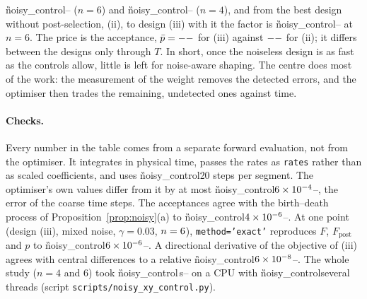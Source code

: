 \G{noisy_control}{\NCSixPostFactor}{--} ($n=6$) and \G{noisy_control}{\NCFourPostFactor}{--} ($n=4$), and from the best
design without post-selection, (ii), to design (iii) with it the factor is \G{noisy_control}{\NCSixGainTotal}{--} at
$n=6$. The price is the acceptance, $\bar p=\G{noisy_control}{\NCSixPThree}{--}$ for (iii) against
$\G{noisy_control}{\NCSixPTwo}{--}$ for (ii); it differs between the designs only through $T$. In short, once the
noiseless design is as fast as the controls allow, little is left for noise-aware shaping. The centre does most of the
work: the measurement of the weight removes the detected errors, and the optimiser then trades the remaining,
undetected ones against time.

\paragraph{Checks.} Every number in the table comes from a separate forward evaluation, not from the optimiser. It
integrates in physical time, passes the rates as \texttt{rates} rather than as scaled coefficients, and uses
\G{noisy_control}{\NCEvalSubsteps}{20} steps per segment. The optimiser's own values differ from it by at most
\G{noisy_control}{$6\times10^{-4}$}{--}, the error of the coarse time steps. The acceptances agree with the birth--death
process of Proposition~\ref{prop:noisy}(a) to \G{noisy_control}{$4\times10^{-6}$}{--}. At one point (design (iii),
mixed noise, $\gamma=0.03$, $n=\G{noisy_control}{\NCnMax}{6}$), \texttt{method='exact'} reproduces $F$,
$F_{\mathrm{post}}$ and $p$ to \G{noisy_control}{$6\times10^{-6}$}{--}. A directional derivative of the objective of
(iii) agrees with central differences to a relative \G{noisy_control}{$6\times10^{-8}$}{--}. The whole study ($n=4$ and
$6$) took \G{noisy_control}{\NCSeconds\,s}{--} on a CPU with \G{noisy_control}{\NCThreads}{several} threads
(script \texttt{scripts/noisy\_xy\_control.py}).

